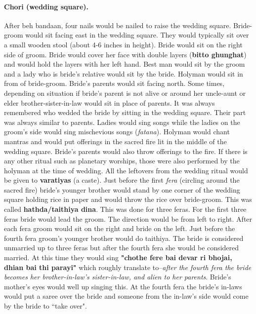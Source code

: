 \paragraph{Chori (wedding square).} After beh bandaan, four nails would be
nailed to raise the wedding square. Bride-groom would sit facing east in the
wedding square. They would typically sit over a small wooden stool (about 4-6
inches in height). Bride would sit on the right side of groom. Bride
would cover her face with double layers (\textbf{bitto ghunghat}) and would
hold the layers with her left hand. Best man would sit by the groom and a lady
who is bride's relative would sit by the bride. Holyman would sit in from of
bride-groom. Bride's parents would sit facing north. Some times, depending on
situation if bride's parent is not alive or around her uncle-aunt or elder
brother-sister-in-law would sit in place of parents. It was always remembered
who wedded the bride by sitting in the wedding square. Their part was always
similar to parents. Ladies would sing songs while the ladies on the groom's
side would sing mischevious songs (\textit{fatana}). Holyman would chant
mantras and would put offerings in the sacred fire lit in the middle of the
wedding square. Bride's parents would also throw offerings to the fire. If
there is any other ritual such as planetary worships, those were also performed
by the holyman at the time of wedding. All the leftovers from the wedding
ritual would be given to \textbf{varatiyas} (a caste). Just before the first
\textit{fera} (circling around the sacred fire) bride's younger brother would
stand by one corner of the wedding square holding rice in paper and would throw
the rice over bride-groom. This was called \textbf{hathda/taithiya dina}. This
was done for three feras. For the first three feras bride would lead the groom.
The direction would be from left to right. After each fera groom would sit on
the right and bride on the left. Just before the fourth fera groom's younger
brother would do taithiya. The bride is considered unmarried up to three feras
but after the fourth fera she would be considered married. At this time they
would sing \textbf{"chothe fere bai devar ri bhojai, dhian bai thi parayi"}
which roughly translate to--\textit{after the fourth fera the bride becomes her
brother-in-law's sister-in-law, and alien to her parents}. Bride's mother's
eyes would well up singing this. At the fourth fera the bride's in-laws
would put a saree over the bride and someone from the in-law's side would
come by the bride to ``take over".

